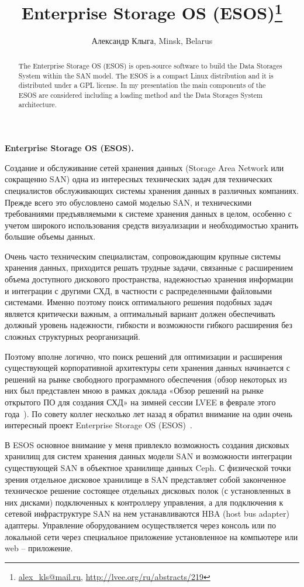 \documentclass[10pt, a5paper]{article}
\begin{document}
\title{Enterprise Storage OS (ESOS)\footnote{\url{alex_kls@mail.ru}, \url{http://lvee.org/ru/abstracts/219}}}
\author{Александр Клыга, Minsk, Belarus}
\maketitle
\begin{abstract}
The Enterprise Storage OS (ESOS) is open-source software to build the Data Storages System within the SAN model. The ESOS is a compact Linux distribution and it is distributed under a GPL license. In my presentation the main components of the ESOS are considered including a loading method and the Data Storages System architecture.
\end{abstract}
\textbf{Enterprise Storage OS (ESOS).}

Создание и обслуживание сетей хранения данных (Storage Area Network или сокращенно SAN) одна из интересных технических задач для технических специалистов обслуживающих системы хранения данных в различных компаниях. Прежде всего это обусловлено самой моделью SAN, и техническими требованиями предъявляемыми к системе хранения данных в целом, особенно с учетом широкого использования средств визуализации и необходимостью хранить большие объемы данных.

Очень часто техническим специалистам, сопровождающим крупные системы хранения данных, приходится решать трудные задачи, связанные с расширением объема доступного дискового пространства, надежностью хранения информации и интеграции с другими СХД, в частности с распределенными файловыми системами. Именно поэтому поиск оптимального решения подобных задач является критически важным, а оптимальный вариант должен обеспечивать должный уровень надежности, гибкости и возможности гибкого расширения без сложных структурных реорганизаций.

Поэтому вполне логично, что поиск решений для оптимизации и расширения существующей корпоративной архитектуры сети хранения данных начинается с решений на рынке свободного программного обеспечения (обзор некоторых из них был представлен мною в рамках доклада «Обзор решений на рынке открытого ПО для создания СХД» на зимней сессии LVEE в феврале этого года~\cite{Kliga1}). По совету коллег несколько лет назад я обратил внимание на один очень интересный проект  Enterprise Storage OS (ESOS)~\cite{Kliga2}.

В ESOS основное внимание у меня привлекло возможность создания дисковых хранилищ для систем хранения данных модели SAN и возможности интеграции существующей SAN в объектное хранилище данных Ceph. 
С физической точки зрения отдельное дисковое хранилище в SAN представляет собой законченное техническое решение состоящее отдельных дисковых полок (с установленных в них дисками)  подключенных к контроллеру управления, а для подключения к сетевой инфраструктуре SAN  на нем устанавливаются HBA (host bus adapter) адаптеры. Управление оборудованием осуществляется через консоль или по локальной сети \linebreak через специальное приложение установленное на компьютере или web – приложение.
\end{document}

